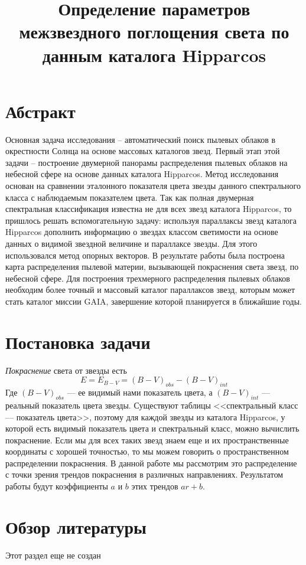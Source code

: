 \documentclass[14pt]{article}
\title{\bf Определение параметров межзвездного поглощения света по данным каталога Hipparcos}
\begin{document}
    \maketitle
    
    \section{Абстракт}
    		Основная задача исследования – автоматический поиск пылевых облаков в окрестности Солнца на основе массовых каталогов звезд. Первый этап этой задачи – построение двумерной панорамы распределения пылевых облаков на небесной сфере на основе данных каталога Hipparcos. Метод исследования основан на сравнении эталонного показателя цвета звезды данного спектрального класса с наблюдаемым показателем цвета. Так как полная двумерная спектральная классификация известна не для всех звезд каталога Hipparcos, то пришлось решать вспомогательную задачу: используя параллаксы звезд каталога Hipparcos дополнить информацию о звездах классом светимости на основе данных о видимой звездной величине и параллаксе звезды. Для этого использовался метод опорных векторов. В результате работы была построена карта распределения пылевой материи, вызывающей покраснения света звезд, по небесной сфере. Для построения трехмерного распределения пылевых облаков необходим более точный и массовый каталог параллаксов звезд, которым может стать каталог миссии GAIA, завершение которой планируется в ближайшие годы.
    
    \section{Постановка задачи}
        {\it Покраснение} света от звезды есть
        $$
            E = E_{B - V} = (B - V)_{obs} - (B - V)_{int}    
        $$ 
        Где $(B - V)_{obs}$ --- ее видимый нами показатель цвета, а $(B - V)_{int}$ --- реальный показатель цвета звезды. Существуют таблицы <<спектральный класс --- показатель цвета>>, поэтому для каждой звезды из каталога Hipparcos, у которой есть видимый показатель цвета и спектральный класс, можно вычислить покраснение. Если мы для всех таких звезд знаем еще и их пространственные координаты с хорошей точностью, то мы можем говорить о пространственном распределении покраснения. В данной работе мы рассмотрим это распределение с точки зрения трендов покраснения в различных направлениях. Результатом работы будут коэффициенты $a$ и $b$ этих трендов $ar + b$. 
        
    \section{Обзор литературы}
        Этот раздел еще не создан
        
\end{document}
